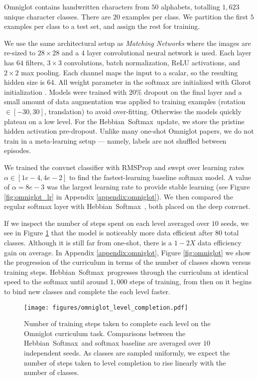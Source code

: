 \documentclass{article} \usepackage{hyperref}
\newcommand{\model}{\hbox{Hebbian Softmax }}
\begin{document}
Omniglot contains handwritten characters from $50$ alphabets, totalling $1,623$ unique character classes. There are $20$ examples per class. We partition the first $5$ examples per class to a test set, and assign the rest for training.

We use the same architectural setup as \textit{Matching Networks} \citep{vinyals2016matching} where the images are re-sized to $28 \times 28$ and a $4$ layer convolutional neural network is used. Each layer has $64$ filters, $3\times 3$ convolutions, batch normalization, ReLU activations, and $2 \times 2$ max pooling. Each channel maps the input to a scalar, so the resulting hidden size is $64$. All weight parameter in the softmax are initialized with Glorot initialization \citep{glorot2010understanding}. Models were trained with $20$\% dropout on the final layer and a small amount of data augmentation was applied to training examples (rotation $\in [-30, 30]$, translation) to avoid over-fitting. Otherwise the models quickly plateau on a low level. For the \model update, we store the pristine hidden activation pre-dropout. Unlike many one-shot Omniglot papers, we do not train in a meta-learning setup --- namely, labels are not shuffled between episodes.

We trained the convnet classifier with RMSProp and swept over learning rates $\alpha \in [1e-4, 4e-2]$ to find the fastest-learning baseline softmax model. A value of $\alpha = 8e-3$ was the largest learning rate to provide stable learning (see Figure \ref{fig:omniglot_lr} in Appendix \ref{appendix:omniglot}). We then compared the regular softmax layer with \model, both placed on the deep convnet.

If we inspect the number of steps spent on each level averaged over $10$ seeds, we see in Figure \ref{fig:omniglot_levels} that the model is noticeably more data efficient after $80$ total classes. Although it is still far from one-shot, there is a $1-2X$ data efficiency gain on average. In Appendix \ref{appendix:omniglot}, Figure \ref{fig:omniglot} we show the progression of the curriculum in terms of the number of classes shown versus training steps. \model progresses through the curriculum at identical speed to the softmax until around $1,000$ steps of training, from then on it begins to bind new classes and complete the each level faster.


\begin{figure}
    \centering
    \texttt{[image: figures/omniglot\_level\_completion.pdf]}
    \caption{Number of training steps taken to complete each level on the Omniglot curriculum task. Comparisons between the \model and softmax baseline are averaged over $10$ independent seeds. As classes are sampled uniformly, we expect the number of steps taken to level completion to rise linearly with the number of classes.}
    \label{fig:omniglot_levels}
\end{figure}
\end{document}
